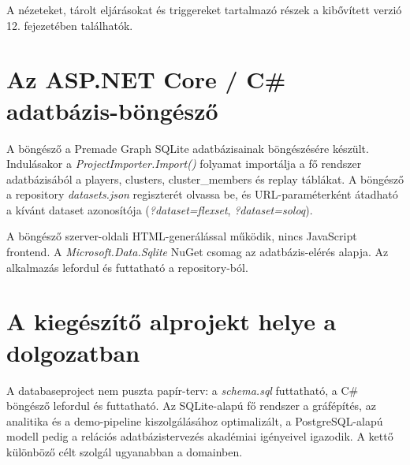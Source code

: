 A nézeteket, tárolt eljárásokat és triggereket tartalmazó részek a kibővített verzió 12. fejezetében találhatók.

\section{Az ASP.NET Core / C\# adatbázis-böngésző}

A böngésző a Premade Graph SQLite adatbázisainak böngészésére készült. Indulásakor a \textit{ProjectImporter.Import()} folyamat importálja a fő rendszer adatbázisából a players, clusters, cluster\_members és replay táblákat. A böngésző a repository \textit{datasets.json} regiszterét olvassa be, és URL-paraméterként átadható a kívánt dataset azonosítója (\textit{?dataset=flexset}, \textit{?dataset=soloq}).

A böngésző szerver-oldali HTML-generálással működik, nincs JavaScript frontend. A \textit{Microsoft.Data.Sqlite} NuGet csomag az adatbázis-elérés alapja. Az alkalmazás lefordul és futtatható a repository-ból.

\section{A kiegészítő alprojekt helye a dolgozatban}

A databaseproject nem puszta papír-terv: a \textit{schema.sql} futtatható, a C\# böngésző lefordul és futtatható. Az SQLite-alapú fő rendszer a gráfépítés, az analitika és a demo-pipeline kiszolgálásához optimalizált, a PostgreSQL-alapú modell pedig a relációs adatbázistervezés akadémiai igényeivel igazodik. A kettő különböző célt szolgál ugyanabban a domainben.
